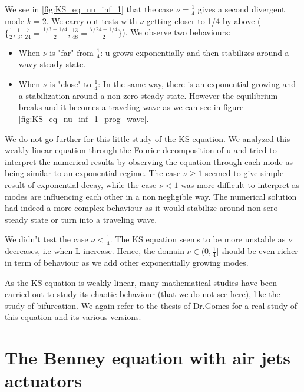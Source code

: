 \documentclass[12pt]{article}
\begin{document}
We see in \eqref{fig:KS_eq_nu_inf_1} that the case $\nu=\frac{1}{4}$ gives a second divergent mode $k=2$. We carry out tests with $\nu$ getting closer to 1/4 by above 
($\{\frac{1}{2}, \frac{1}{3}, \frac{7}{24} = \frac{1/3+1/4}{2}, \frac{13}{48} = \frac{7/24 + 1/4}{2}\}$). We observe two behaviours:
\begin{itemize}
    \item When $\nu$ is "far" from $\frac{1}{4}$: u grows exponentially and then stabilizes around a wavy steady state.
    \item When $\nu$ is "close" to $\frac{1}{4}$: In the same way, there is an exponential growing and a stabilization around a non-zero steady state. 
    However the equilibrium breaks and it becomes a traveling wave as we can see in figure \ref{fig:KS_eq_nu_inf_1_prog_wave}.
\end{itemize}


We do not go further for this little study of the KS equation. We analyzed this weakly linear equation through the Fourier decomposition of u and tried to
 interpret the numerical results by observing the equation through each mode as being similar to an exponential regime. The case $\nu \geq1$ seemed to give simple result 
 of exponential decay, while the case $\nu <1$ was more difficult to interpret as modes are influencing each other in a non negligible way. The numerical solution had indeed 
 a more complex behaviour as it would stabilize around non-sero steady state or turn into a traveling wave.

We didn't test the case $\nu <\frac{1}{4}$. The KS equation seems to be more unstable as $\nu$ decreases, i.e when L increase. Hence, the domain $\nu \in (0,\frac{1}{4}] $ 
should be even richer in term of behaviour as we add other exponentially growing modes.

As the KS equation is weakly linear, many mathematical studies have been carried out to study its chaotic behaviour (that we do not see here), like the study of bifurcation.
 We again refer to the thesis of Dr.Gomes \cite{Susana_thesis} for a real study of this equation and its various versions.




\newpage




\section{The Benney equation with air jets actuators}\label{Section_Benney_eq}
\end{document}
